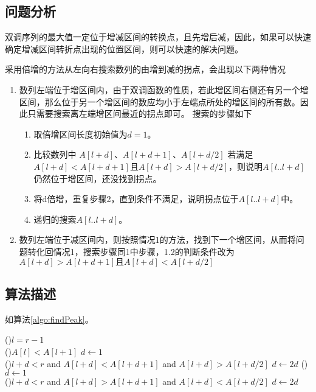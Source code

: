 \subsection*{问题分析}

双调序列的最大值一定位于增减区间的转换点，且先增后减，因此，如果可以快速确定增减区间转折点出现的位置区间，则可以快速的解决问题。

采用倍增的方法从左向右搜索数列的由增到减的拐点，会出现以下两种情况

\begin{enumerate}
    \item 数列左端位于增区间内，由于双调函数的性质，若此增区间右侧还有另一个增区间，那么位于另一个增区间的数应均小于左端点所处的增区间的所有数。因此只需要搜索离左端增区间最近的拐点即可。
    搜索的步骤如下\begin{enumerate}
        \item 取倍增区间长度初始值为$d = 1$。
        \item 比较数列中 $A[l + d]$、$A[l + d + 1]$、$A[l + d/2]$ 若满足$A[l + d] < A[l + d + 1] \text{且} A[l + d] > A[l + d/2]$，则说明$A[l..l+d]$仍然位于增区间，还没找到拐点。
        \item 将d倍增，重复步骤2，直到条件不满足，说明拐点位于$A[l..l+d]$中。
        \item 递归的搜索$A[l..l+d]$。
    \end{enumerate}
    \item 数列左端位于减区间内，则按照情况1的方法，找到下一个增区间，从而将问题转化回情况1，搜索步骤同1中步骤，1.2的判断条件改为$A[l + d] > A[l + d + 1] \text{且} A[l + d] < A[l + d/2]$
\end{enumerate}

\subsection*{算法描述}

如算法\ref{algo:findPeak}。\\

\begin{algorithm}[H]
    \caption{$findPeak(l, r)$}\label{algo:findPeak}
    \If(){$l=r-1$}{
        \\
    }
    \If(){$A[l] < A[l+1]$}{
        $d \leftarrow 1$\\
        \While(){$l+d < r $ and $A[l + d] < A[l + d + 1] $ and $ A[l + d] > A[l + d/2]$}{
            $d \leftarrow 2d$
        }
    }\Else(){
        $d \leftarrow 1$\\
        \While(){$l+d < r $ and $A[l + d] > A[l + d + 1] $ and $ A[l + d] < A[l + d/2]$}{
            $d \leftarrow 2d$
        }
    }
\end{algorithm}

